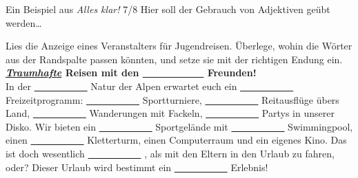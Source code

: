 \begin{frame}
  {Ein Beispiel aus \textit{Alles klar!} 7\slash 8}
  Hier soll der Gebrauch von \alert{Adjektiven} geübt werden\ldots\\
  \Zeile
  \begin{center}
    \begin{minipage}{0.15\textwidth}\footnotesize
    \end{minipage}\hspace{0.05\textwidth}\begin{minipage}{0.7\textwidth}\footnotesize{}
      \alert{Lies die Anzeige eines Veranstalters für Jugendreisen. Überlege, wohin die Wörter aus der Randspalte passen könnten, und setze sie mit der richtigen Endung ein.}\\

      \textbf{\ul{\textit{Traumhafte}} Reisen mit den \ul{\ \ \ \ \ \ \ \ \ \ \ } Freunden!}\\

      In der \ul{\ \ \ \ \ \ \ \ \ \ \ }
      Natur der Alpen erwartet euch ein \ul{\ \ \ \ \ \ \ \ \ \ \ }
      Freizeitprogramm: \ul{\ \ \ \ \ \ \ \ \ \ \ }
      Sportturniere, \ul{\ \ \ \ \ \ \ \ \ \ \ }
      Reitausflüge übers Land, \ul{\ \ \ \ \ \ \ \ \ \ \ }
      Wanderungen mit Fackeln, \ul{\ \ \ \ \ \ \ \ \ \ \ }
      Partys in unserer Disko. Wir bieten ein \ul{\ \ \ \ \ \ \ \ \ \ \ }
      Sportgelände mit \ul{\ \ \ \ \ \ \ \ \ \ \ }
      Swimmingpool, einen \ul{\ \ \ \ \ \ \ \ \ \ \ }
      Kletterturm, einen Computerraum und ein eigenes Kino. Das ist doch wesentlich \ul{\ \ \ \ \ \ \ \ \ \ \ }
      , als mit den Eltern in den Urlaub zu fahren, oder? Dieser Urlaub wird bestimmt ein \ul{\ \ \ \ \ \ \ \ \ \ \ }
      Erlebnis!
    \end{minipage}
  \end{center}
  \Viertelzeile
  \tiny {}
\end{frame}


